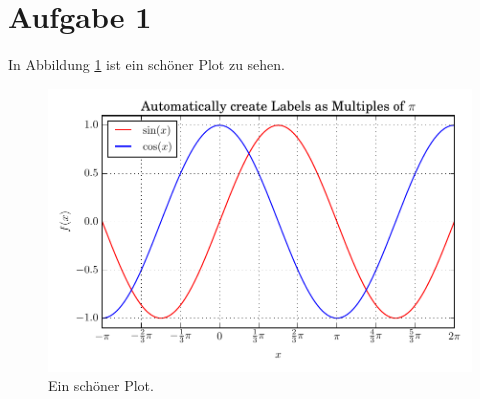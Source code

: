 \documentclass[
  captions=tableheading,
]{scrartcl}
\begin{document}
\section*{Aufgabe 1}
In Abbildung \ref{fig:plot1} ist ein schöner Plot zu sehen.
\blindtext
\begin{figure}
  \centering
  \includegraphics[scale=1]{plot1.pdf}
  \caption{Ein schöner Plot.}
  \label{fig:plot1}
\end{figure}
\blindtext
\end{document}
